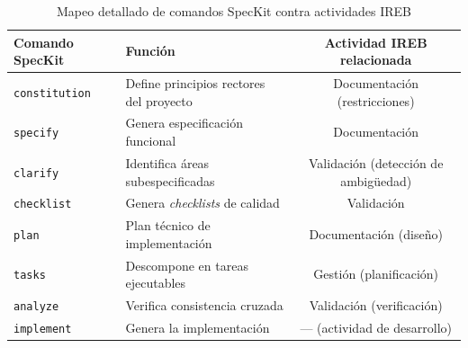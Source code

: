 \begin{table}[h]
\centering
\caption{Mapeo detallado de comandos SpecKit contra actividades IREB}
\label{tab:mapa-detallado}
\begin{tabularx}{\textwidth}{lXc}
\toprule
\textbf{Comando SpecKit} & \textbf{Funci\'on} & \textbf{Actividad IREB relacionada} \\
\midrule
\texttt{constitution} & Define principios rectores del proyecto & Documentaci\'on (restricciones) \\
\texttt{specify} & Genera especificaci\'on funcional & Documentaci\'on \\
\texttt{clarify} & Identifica \'areas subespecificadas & Validaci\'on (detecci\'on de ambig\"uedad) \\
\texttt{checklist} & Genera \emph{checklists} de calidad & Validaci\'on \\
\texttt{plan} & Plan t\'ecnico de implementaci\'on & Documentaci\'on (dise\~no) \\
\texttt{tasks} & Descompone en tareas ejecutables & Gesti\'on (planificaci\'on) \\
\texttt{analyze} & Verifica consistencia cruzada & Validaci\'on (verificaci\'on) \\
\texttt{implement} & Genera la implementaci\'on & --- (actividad de desarrollo) \\
\bottomrule
\end{tabularx}
\end{table}
